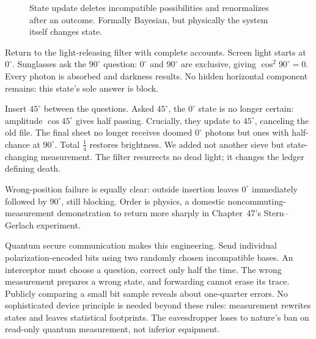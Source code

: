 \begin{figure}[htbp]
\centering
{}
\caption{State update deletes incompatible possibilities and renormalizes after an outcome. Formally Bayesian, but physically the system itself changes state.}
\end{figure}


Return to the light-releasing filter with complete accounts. Screen light starts at $0^\circ$. Sunglasses ask the $90^\circ$ question: $0^\circ$ and $90^\circ$ are exclusive, giving $\cos^2 90^\circ=0$. Every photon is absorbed and darkness results. No hidden horizontal component remains: this state's sole answer is block.

Insert $45^\circ$ between the questions. Asked $45^\circ$, the $0^\circ$ state is no longer certain: amplitude $\cos 45^\circ$ gives half passing. Crucially, they update to $45^\circ$, canceling the old file. The final sheet no longer receives doomed $0^\circ$ photons but ones with half-chance at $90^\circ$. Total $\tfrac14$ restores brightness. We added not another sieve but state-changing measurement. The filter resurrects no dead light; it changes the ledger defining death.

Wrong-position failure is equally clear: outside insertion leaves $0^\circ$ immediately followed by $90^\circ$, still blocking. Order is physics, a domestic noncommuting-measurement demonstration to return more sharply in Chapter~47's Stern--Gerlach experiment.

Quantum secure communication makes this engineering. Send individual polarization-encoded bits using two randomly chosen incompatible bases. An interceptor must choose a question, correct only half the time. The wrong measurement prepares a wrong state, and forwarding cannot erase its trace. Publicly comparing a small bit sample reveals about one-quarter errors. No sophisticated device principle is needed beyond these rules: measurement rewrites states and leaves statistical footprints. The eavesdropper loses to nature's ban on read-only quantum measurement, not inferior equipment.

